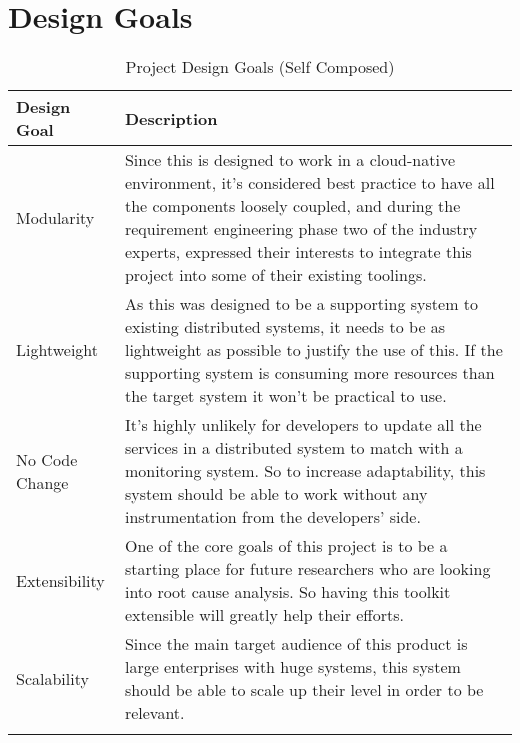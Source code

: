 \section{Design Goals}
\begin{longtable}{|p{22mm}|p{131mm}|}
\hline
\textbf{Design Goal} &
    \textbf{Description} \\ \hline
    Modularity &
    Since this is designed to work in a cloud-native environment, it’s considered best practice to have all the components loosely coupled, and during the requirement engineering phase two of the industry experts, expressed their interests to integrate this project into some of their existing toolings. \\ \hline
    
    Lightweight &
    As this was designed to be a supporting system to existing distributed systems, it needs to be as lightweight as possible to justify the use of this. If the supporting system is consuming more resources than the target system it won’t be practical to use. \\ \hline
    
    No Code Change &
    It’s highly unlikely for developers to update all the services in a distributed system to match with a monitoring system. So to increase adaptability, this system should be able to work without any instrumentation from the developers’ side. \\ \hline
    
    Extensibility &
    One of the core goals of this project is to be a starting place for future researchers who are looking into root cause analysis. So having this toolkit extensible will greatly help their efforts. \\ \hline
    
    Scalability &
    Since the main target audience of this product is large enterprises with huge systems, this system should be able to scale up their level in order to be relevant. \\ \hline

    \caption{Project Design Goals (Self Composed)}
\end{longtable}